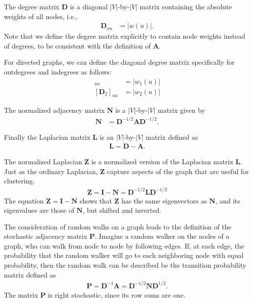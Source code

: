 \documentclass{article}
\begin{document}
The degree matrix $\mathbf D$ is a diagonal $|V|$-by-$|V|$ matrix containing
the absolute weights of all nodes, i.e.,
\begin{align}
  \mathbf D_{uu} &= |w(u)|. 
\end{align}
Note that we define the degree matrix explicitly to contain node weights
instead of degrees, to be consistent with the definition of $\mathbf
A$. 

For directed graphs, we can define the diagonal degree matrix
specifically for outdegrees and indegrees as follows:
\begin{align}
  [\mathbf D_1]_{uu} &= |w_1(u)| \\
  [\mathbf D_2]_{uu} &= |w_2(u)| 
\end{align}

The normalized adjacency matrix $\mathbf N$ is a $|V|$-by-$|V|$ matrix
given by
\begin{align}
  \mathbf N &= \mathbf D^{-1/2} \mathbf A \mathbf D^{-1/2}. 
\end{align}

Finally the Laplacian matrix $\mathbf L$ is an $|V|$-by-$|V|$ matrix
defined as
\begin{align}
  \mathbf L = \mathbf D - \mathbf A. 
\end{align}


The normalized Laplacian $\mathbf Z$ is a normalized version of the Laplacian matrix
$\mathbf L$.  Just as the ordinary Laplacian, $\mathbf Z$ capture
aspects of the graph that are useful for clustering. 
\begin{align}
  \mathbf Z = \mathbf I - \mathbf N = \mathbf D^{-1/2} \mathbf L \mathbf
  D^{-1/2}
\end{align}
The equation $\mathbf Z = \mathbf I - \mathbf N$ shows that $\mathbf Z$
has the same eigenvectors as $\mathbf N$, and its eigenvalues are those
of $\mathbf N$, but shifted and inverted. 

The consideration of random walks on a graph leads to the definition of
the stochastic adjacency matrix $\mathbf P$.  Imagine a random walker on
the nodes of a graph, who can walk from node to node by following
edges.  If, at each edge, the probability that the random walker will go
to each neighboring node with equal probability, then the random walk
can be described be the transition probability matrix defined as
\begin{align}
  \mathbf P = \mathbf D^{-1} \mathbf A = \mathbf D^{-1/2} \mathbf N
  \mathbf D^{1/2}.
\end{align}
The matrix $\mathbf P$ is right stochastic, since its row sums are one. 
\end{document}
